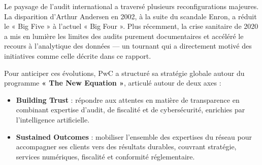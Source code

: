 \documentclass[12pt,a4paper,twoside]{report}
\begin{document}
Le paysage de l'audit international a traversé plusieurs reconfigurations majeures. La disparition d'Arthur Andersen en 2002, à la suite du scandale Enron, a réduit le « Big Five » à l'actuel « Big Four ». Plus récemment, la crise sanitaire de 2020 a mis en lumière les limites des audits purement documentaires et accéléré le recours à l'analytique des données --- un tournant qui a directement motivé des initiatives comme celle décrite dans ce rapport.

Pour anticiper ces évolutions, PwC a structuré sa stratégie globale autour du programme \textbf{« The New Equation »}, articulé autour de deux axes :
\begin{itemize}
  \item \textbf{Building Trust} : répondre aux attentes en matière de transparence en combinant expertise d'audit, de fiscalité et de cybersécurité, enrichies par l'intelligence artificielle.
  \item \textbf{Sustained Outcomes} : mobiliser l'ensemble des expertises du réseau pour accompagner ses clients vers des résultats durables, couvrant stratégie, services numériques, fiscalité et conformité réglementaire.
\end{itemize}
\end{document}
